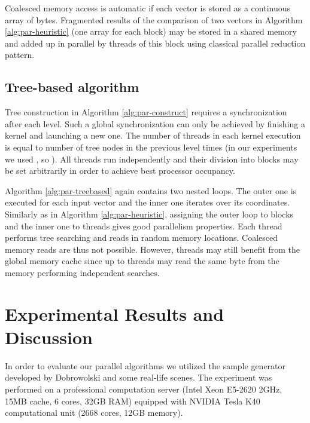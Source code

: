 \documentclass[a4paper]{article}
\begin{document}
Coalesced memory access is automatic if each vector is stored as a continuous array of bytes. 
Fragmented results of the comparison of two vectors in Algorithm \ref{alg:par-heuristic} (one array for each block) may be stored in a shared memory and added up in parallel by threads of this block using classical parallel reduction pattern.

\subsection{Tree-based algorithm}

Tree construction in Algorithm \ref{alg:par-construct} requires a synchronization after each level. Such a global synchronization can only be achieved by finishing a kernel and launching a new one. 
The number of threads in each kernel execution is equal to number of tree nodes in the previous level times  (in our experiments we used , so ). All threads run independently and their division into blocks may be set arbitrarily in order to achieve best processor occupancy.

Algorithm \ref{alg:par-treebased} again contains two nested loops. The outer one is executed for each input vector and the inner one iterates over its coordinates. Similarly as in Algorithm \ref{alg:par-heuristic}, assigning the outer loop to blocks and the inner one to threads gives good parallelism properties. Each thread performs tree searching and reads in random memory locations. Coalesced memory reads are thus not possible. However, threads may still benefit from the global memory cache since up to  threads may read the same byte from the memory performing independent searches. 





\section{Experimental Results and Discussion}
\label{sec:experiments}

In order to evaluate our parallel algorithms we utilized the sample generator developed by Dobrowolski \cite{DBLP:conf/sii/Dobrowolski13} and some real-life scenes. The experiment was performed on a professional computation server (Intel Xeon E5-2620 2GHz, 15MB cache, 6 cores, 32GB RAM) equipped with NVIDIA Tesla K40 computational unit (2668 cores, 12GB memory). 
\end{document}
